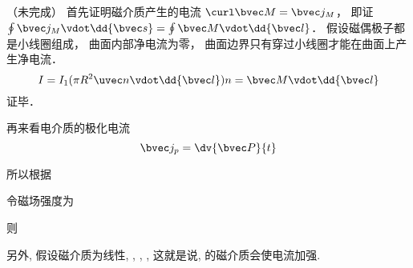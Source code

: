 
（未完成）
首先证明磁介质产生的电流 $\curl \bvec M = \bvec j_M$， 即证 $\oint \bvec j_M \vdot \dd{\bvec s} = \oint \bvec M \vdot \dd{\bvec l}$． 假设磁偶极子都是小线圈组成， 曲面内部净电流为零， 曲面边界只有穿过小线圈才能在曲面上产生净电流．
\begin{equation}
I = I_1 (\pi R^2 \uvec n \vdot \dd{\bvec l}) n = \bvec M \vdot \dd{\bvec l}
\end{equation}
证毕．

再来看电介质的极化电流
\begin{equation}
\bvec j_p = \dv{\bvec P}{t}
\end{equation}


所以根据
 
令磁场强度为
 
则
 
另外, 假设磁介质为线性,
 ,  ,  ,  
这就是说,  的磁介质会使电流加强.
